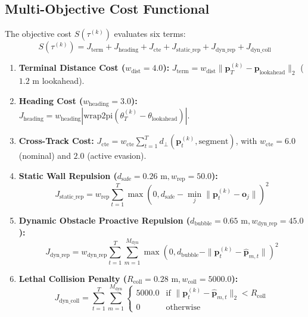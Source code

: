 \documentclass[10pt,a4paper]{article}
\begin{document}
\subsection{Multi-Objective Cost Functional}
The objective cost $S(\tau^{(k)})$ evaluates six terms:
\begin{equation}
S(\tau^{(k)}) = J_{\text{term}} + J_{\text{heading}} + J_{\text{cte}} + J_{\text{static\_rep}} + J_{\text{dyn\_rep}} + J_{\text{dyn\_coll}}
\end{equation}
\begin{enumerate}
    \item \textbf{Terminal Distance Cost ($w_{\text{dist}} = 4.0$):} $J_{\text{term}} = w_{\text{dist}} \|\mathbf{p}_T^{(k)} - \mathbf{p}_{\text{lookahead}}\|_2$ ($1.2\text{ m}$ lookahead).
    \item \textbf{Heading Cost ($w_{\text{heading}} = 3.0$):} $J_{\text{heading}} = w_{\text{heading}} |\text{wrap2pi}(\theta_T^{(k)} - \theta_{\text{lookahead}})|$.
    \item \textbf{Cross-Track Cost:} $J_{\text{cte}} = w_{\text{cte}} \sum_{t=1}^T d_{\perp}(\mathbf{p}_t^{(k)}, \text{segment})$, with $w_{\text{cte}} = 6.0$ (nominal) and $2.0$ (active evasion).
    \item \textbf{Static Wall Repulsion ($d_{\text{safe}} = 0.26\text{ m}, w_{\text{rep}} = 50.0$):}
    \begin{equation}
    J_{\text{static\_rep}} = w_{\text{rep}} \sum_{t=1}^T \max\left(0, d_{\text{safe}} - \min_j \|\mathbf{p}_t^{(k)} - \mathbf{o}_j\|\right)^2
    \end{equation}
    \item \textbf{Dynamic Obstacle Proactive Repulsion ($d_{\text{bubble}} = 0.65\text{ m}, w_{\text{dyn\_rep}} = 45.0$):}
    \begin{equation}
    J_{\text{dyn\_rep}} = w_{\text{dyn\_rep}} \sum_{t=1}^T \sum_{m=1}^{M_{\text{dyn}}} \max\left(0, d_{\text{bubble}} - \|\mathbf{p}_t^{(k)} - \hat{\mathbf{p}}_{m, t}\|\right)^2
    \end{equation}
    \item \textbf{Lethal Collision Penalty ($R_{\text{coll}} = 0.28\text{ m}, w_{\text{coll}} = 5000.0$):}
    \begin{equation}
    J_{\text{dyn\_coll}} = \sum_{t=1}^T \sum_{m=1}^{M_{\text{dyn}}} \begin{cases} 5000.0 & \text{if } \|\mathbf{p}_t^{(k)} - \hat{\mathbf{p}}_{m, t}\|_2 < R_{\text{coll}} \\ 0 & \text{otherwise} \end{cases}
    \end{equation}
\end{enumerate}
\end{document}

